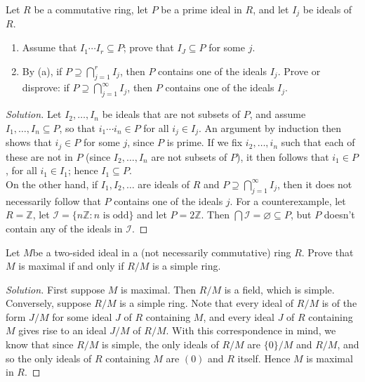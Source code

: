 \documentclass[12pt]{article}
\newenvironment{problem}[2][Problem]{\begin{trivlist}
\item[\hskip \labelsep {\bfseries #1}\hskip \labelsep {\bfseries #2.}]}{\end{trivlist}}
\newenvironment{solution}
  {\renewcommand\qedsymbol{$\blacksquare$}\begin{proof}[Solution]}
{\end{proof}}
\theoremstyle{remark}
\begin{document}
\begin{problem}{4.19}
  Let $R$ be a commutative ring, let $P$ be a prime ideal in $R$, and let
  $I_j$ be ideals of $R$.
  \begin{enumerate}[label=(\alph*)]
    \item Assume that $I_1\cdots I_r\subseteq P$; prove that $I_J\subseteq P$
      for some $j$.
    \item By (a), if $P\supseteq \bigcap_{j=1}^{r} I_j$, then
      $P$ contains one of the ideals $I_j$.
      Prove or disprove: if $P\supseteq \bigcap_{j=1}^{\infty} I_j$,
      then $P$ contains one of the ideals $I_j$.
  \end{enumerate}
\end{problem}
\begin{solution}
  Let $I_2,\dots,I_n$ be ideals that are not subsets of $P$,
  and assume $I_1,\dots,I_n\subseteq P$, so that
  $i_1\cdots i_n\in P$ for all $i_j\in I_j$.
  An argument by induction then shows that $i_j\in P$ for some 
  $j$, since $P$ is prime.
  If we fix $i_2,\dots,i_n$ such that each of these are not
  in $P$ (since $I_2,\dots,I_n$ are not subsets of $P$),
  it then follows that $i_1\in P$, for all $i_1\in I_1$;
  hence $I_1\subseteq P$. \\
  \indent On the other hand, if $I_1,I_2,\dots$ are ideals of
  $R$ and $P\supseteq\bigcap_{j=1}^\infty I_j$, then it does not
  necessarily follow that $P$ contains one of the ideals $j$.
  For a counterexample, let $R=\mathbb{Z}$, let 
  $\mathcal{I} = \{n\mathbb{Z} : n\text{ is odd}\}$
  and let $P=2\mathbb{Z}$.
  Then $\bigcap\mathcal{I}=\varnothing\subseteq P$, but $P$
  doesn't contain any of the ideals in $\mathcal{I}$.
\end{solution}

\begin{problem}{4.20}
  Let $M$be a two-sided ideal in a (not necessarily commutative) ring $R$.
  Prove that $M$ is maximal if and only if $R/M$ is a simple ring.
\end{problem}
\begin{solution}
  First suppose $M$ is maximal.
  Then $R/M$ is a field, which is simple.\\
  \indent Conversely, suppose $R/M$ is a simple ring.
  Note that every ideal of $R/M$ is of the form $J/M$ for some ideal $J$
  of $R$ containing $M$, and every ideal $J$ of $R$ containing $M$
  gives rise to an ideal $J/M$ of $R/M$.
  With this correspondence in mind, we know that since $R/M$ is simple,
  the only ideals of $R/M$ are $\{0\}/M$ and $R/M$, and so the only ideals
  of $R$ containing $M$ are $(0)$ and $R$ itself.
  Hence $M$ is maximal in $R$.
\end{solution}
\end{document}
